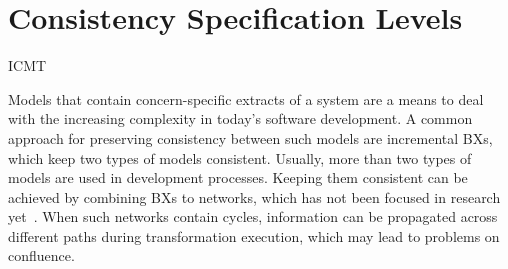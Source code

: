 \chapter{Consistency Specification Levels
}

\begin{copiedFrom}{ICMT}

Models that contain concern-specific extracts of a system are a means to deal with the increasing complexity in today's software development. %
A common approach for preserving consistency between %
such models are incremental \acp{BX}, which %
keep two types of models consistent.
Usually, more than two types of models are used in development processes. %
Keeping them consistent can be achieved by combining \acp{BX} to networks, which has not been focused in research yet~\cite{stevens2017a}.
When such networks contain cycles, %
information can be propagated across different paths during transformation execution, which may lead to problems on confluence.


\end{copiedFrom}
